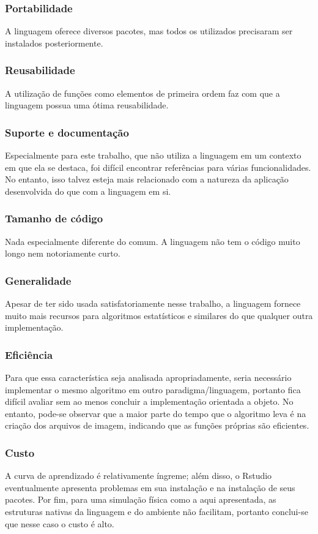 \documentclass[rel_mlp]{iiufrgs}
\begin{document}
\subsubsection{Portabilidade}
A linguagem oferece diversos pacotes, mas todos os utilizados precisaram ser instalados posteriormente.

\subsubsection{Reusabilidade}
A utilização de funções como elementos de primeira ordem faz com que a linguagem possua uma ótima reusabilidade.

\subsubsection{Suporte e documentação}
Especialmente para este trabalho, que não utiliza a linguagem em um contexto em que ela se destaca, foi difícil encontrar referências para várias funcionalidades. No entanto, isso talvez esteja mais relacionado com a natureza da aplicação desenvolvida do que com a linguagem em si.

\subsubsection{Tamanho de código}
Nada especialmente diferente do comum. A linguagem não tem o código muito longo nem notoriamente curto.

\subsubsection{Generalidade}
Apesar de ter sido usada satisfatoriamente nesse trabalho, a linguagem fornece muito mais recursos para algoritmos estatísticos e similares do que qualquer outra implementação.

\subsubsection{Eficiência}
Para que essa característica seja analisada apropriadamente, seria necessário implementar o mesmo algoritmo em outro paradigma/linguagem, portanto fica difícil avaliar sem ao menos concluir a implementação orientada a objeto. No entanto, pode-se observar que a maior parte do tempo que o algoritmo leva é na criação dos arquivos de imagem, indicando que as funções próprias são eficientes.

\subsubsection{Custo}
A curva de aprendizado é relativamente íngreme; além disso, o Rstudio eventualmente apresenta problemas em sua instalação e na instalação de seus pacotes. Por fim, para uma simulação física como a aqui apresentada, as estruturas nativas da linguagem e do ambiente não facilitam, portanto conclui-se que nesse caso o custo é alto.
\end{document}
